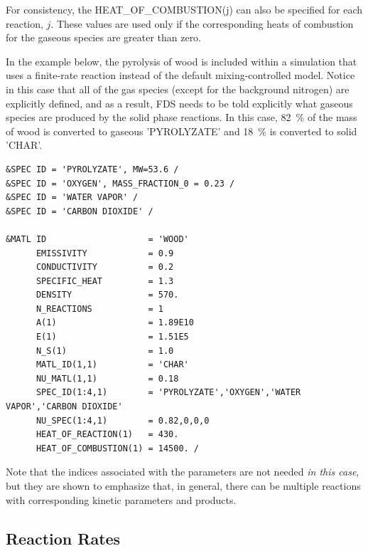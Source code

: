 \documentclass[11pt]{book}
\begin{document}
For consistency, the {\ct HEAT\_OF\_COMBUSTION(j)} can also be specified for each reaction, $j$. These values are
used only if the corresponding heats of combustion for the gaseous species are greater than zero.

In the example below, the pyrolysis of wood is included within a simulation that uses
a finite-rate reaction instead of the default mixing-controlled model. Notice in this case that
all of the gas species (except for the background nitrogen) are explicitly defined, and as a result, FDS
needs to be told explicitly what gaseous species are produced by the solid phase reactions. In this case, 82~\% of the
mass of wood is converted to gaseous {\ct 'PYROLYZATE'} and 18~\% is converted to solid {\ct 'CHAR'}.
\begin{lstlisting}
&SPEC ID = 'PYROLYZATE', MW=53.6 /
&SPEC ID = 'OXYGEN', MASS_FRACTION_0 = 0.23 /
&SPEC ID = 'WATER VAPOR' /
&SPEC ID = 'CARBON DIOXIDE' /

&MATL ID                    = 'WOOD'
      EMISSIVITY            = 0.9
      CONDUCTIVITY          = 0.2
      SPECIFIC_HEAT         = 1.3
      DENSITY               = 570.
      N_REACTIONS           = 1
      A(1)                  = 1.89E10
      E(1)                  = 1.51E5
      N_S(1)                = 1.0
      MATL_ID(1,1)          = 'CHAR'
      NU_MATL(1,1)          = 0.18
      SPEC_ID(1:4,1)        = 'PYROLYZATE','OXYGEN','WATER VAPOR','CARBON DIOXIDE'
      NU_SPEC(1:4,1)        = 0.82,0,0,0
      HEAT_OF_REACTION(1)   = 430.
      HEAT_OF_COMBUSTION(1) = 14500. /
\end{lstlisting}
Note that the indices associated with the parameters are not needed {\em in this case}, but they are shown to emphasize that, in general, there can
be multiple reactions with corresponding kinetic parameters and products.

\subsection{Reaction Rates}
\end{document}
